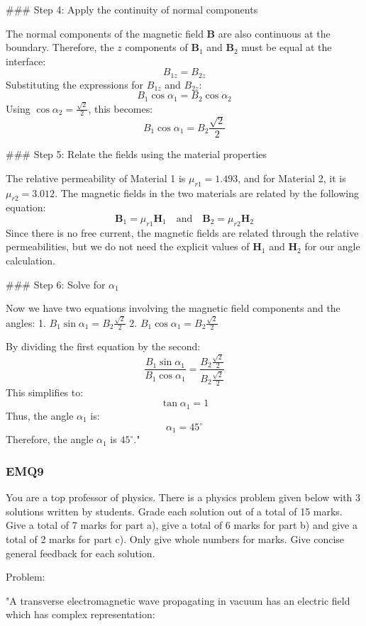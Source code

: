### Step 4: Apply the continuity of normal components

The normal components of the magnetic field $\mathbf{B}$ are also continuous at the boundary. Therefore, the $z$ components of $\mathbf{B}_1$ and $\mathbf{B}_2$ must be equal at the interface:
\[
B_{1z} = B_{2z}
\]
Substituting the expressions for $B_{1z}$ and $B_{2z}$:
\[
B_1 \cos \alpha_1 = B_2 \cos \alpha_2
\]
Using $\cos \alpha_2 = \frac{\sqrt{2}}{2}$, this becomes:
\[
B_1 \cos \alpha_1 = B_2 \frac{\sqrt{2}}{2}
\]

### Step 5: Relate the fields using the material properties

The relative permeability of Material 1 is $\mu_{r1} = 1.493$, and for Material 2, it is $\mu_{r2} = 3.012$. The magnetic fields in the two materials are related by the following equation:
\[
\mathbf{B}_1 = \mu_{r1} \mathbf{H}_1 \quad \text{and} \quad \mathbf{B}_2 = \mu_{r2} \mathbf{H}_2
\]
Since there is no free current, the magnetic fields are related through the relative permeabilities, but we do not need the explicit values of $\mathbf{H}_1$ and $\mathbf{H}_2$ for our angle calculation.

### Step 6: Solve for $\alpha_1$

Now we have two equations involving the magnetic field components and the angles:
1. \( B_1 \sin \alpha_1 = B_2 \frac{\sqrt{2}}{2} \)
2. \( B_1 \cos \alpha_1 = B_2 \frac{\sqrt{2}}{2} \)

By dividing the first equation by the second:
\[
\frac{B_1 \sin \alpha_1}{B_1 \cos \alpha_1} = \frac{B_2 \frac{\sqrt{2}}{2}}{B_2 \frac{\sqrt{2}}{2}}
\]
This simplifies to:
\[
\tan \alpha_1 = 1
\]
Thus, the angle $\alpha_1$ is:
\[
\alpha_1 = 45^\circ
\]
Therefore, the angle $\alpha_1$ is $45^\circ$."

\subsubsection{EMQ9}

You are a top professor of physics. There is a physics problem given below with 3 solutions written by students. Grade each solution out of a total of 15 marks. Give a total of 7 marks for part a), give a total of 6 marks for part b) and give a total of 2 marks for part c). Only give whole numbers for marks. Give concise general feedback for each solution. 

Problem:

"A transverse electromagnetic wave propagating in vacuum has an electric field which has complex representation:


